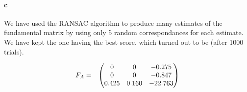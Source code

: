 \documentclass[11pt,a4paper]{article}
\begin{document}
\paragraph{c}
We have used the RANSAC algorithm to produce many estimates of the fundamental matrix by using only 5 random correspondances for each estimate.
We have kept the one having the best score, which turned out to be (after 1000 trials).

\[
\begin{array}{lc}
F_{A} = & \left(\begin{array}{@{}ccc@{}}
                    0 & 0 & -0.275 \\
                    0 & 0 & -0.847 \\
                    0.425 & 0.160 & -22.763
                  \end{array}\right)\\ [15pt]
  
\end{array} 
\]
\end{document}
